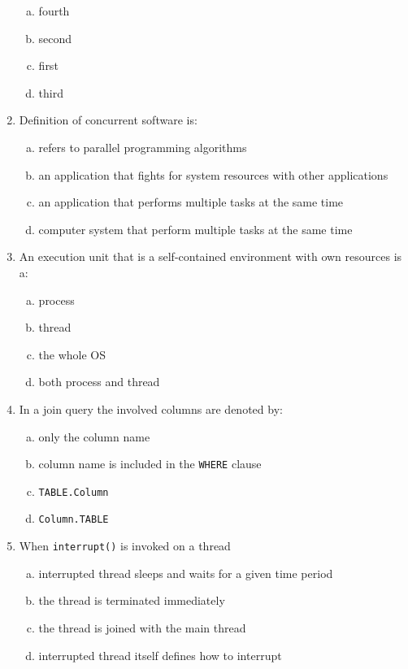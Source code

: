\documentclass[10pt,a4paper,twocolumn]{article}
\begin{document}
\begin{enumerate}
\begin{enumerate}[(a)]
	\item fourth
	\item second
	\item first
	\item third
\end{enumerate}
\item Definition of concurrent software is:
\begin{enumerate}[(a)]
	\item refers to parallel programming algorithms
	\item an application that fights for system resources with other applications
	\item an application that performs multiple tasks at the same time
	\item computer system that perform multiple tasks at the same time
\end{enumerate}
\item An execution unit that is a self-contained environment with own resources is a:
\begin{enumerate}[(a)]
	\item process
	\item thread
	\item the whole OS
	\item both process and thread
\end{enumerate}
\item In a join query the involved columns are denoted by:
\begin{enumerate}[(a)]
	\item only the column name
	\item column name is included in the \texttt{WHERE} clause
	\item \texttt{TABLE.Column}
	\item \texttt{Column.TABLE}
\end{enumerate}
\item When \texttt{interrupt()} is invoked on a thread
\begin{enumerate}[(a)]
	\item interrupted thread sleeps and waits for a given time period
	\item the thread is terminated immediately
	\item the thread is joined with the main thread
	\item interrupted thread itself defines how to interrupt
\end{enumerate}
\end{enumerate}
\clearpage
\end{document}

